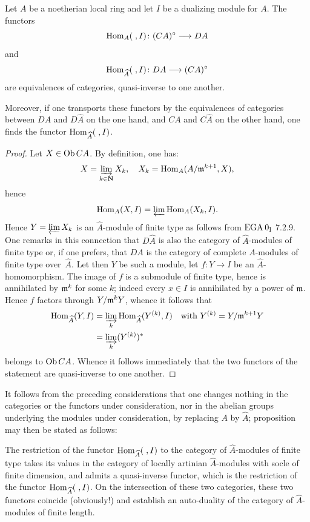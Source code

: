 \begin{proposition} \label{IV.5.1}
Let $A$ be a noetherian local ring and let $I$ be a dualizing module for $A$. The functors
$$
\Hom_{A}(\;, I)\colon (CA)^{\circ}\to DA
$$
and
$$
\Hom_{\hat{A}}(\;, I)\colon DA\to (CA)^{\circ}
$$
are equivalences of categories, quasi-inverse to one another.

Moreover, if one transports these functors by the equivalences of categories between $DA$ and $D\hat{A}$ on the one hand, and $CA$ and $C\hat{A}$ on the other hand, one finds the functor $\operatorname{Hom}_{\widehat{A}}(\;, I)$.
\end{proposition}

\begin{proof}
Let $X\in \operatorname{Ob} CA$. By definition, one has:
$$
X=\varinjlim_{k\in {\mathbf N}}X_{k}, \quad X_{k}=\operatorname{Hom}_{A}(A/\mathfrak{m}^{k+1}, X),
$$
hence
$$
\operatorname{Hom}_{A}(X, I)=\varprojlim \operatorname{Hom}_{A}(X_{k}, I).
$$
Hence $Y=\varprojlim X_{k}$ is an $\hat{A}$-module of finite type as follows from $\textup{EGA}\kern.2em 0_{\textup{I}}$ 7.2.9. One remarks in this connection that $D\hat{A}$ is also the category of $\hat{A}$-modules of finite type or, if one prefers, that $DA$ is the category of complete $A$-modules of finite type over~$\hat{A}$. Let then $Y$ be such a module, let $f:Y\to I$ be an $\hat{A}$-homomorphism. The image of $f$ is a submodule of finite type, hence is annihilated by $\mathfrak{m}^{k}$ for some $k$; indeed every $x\in I$ is annihilated by a power of $\mathfrak{m}$. Hence $f$ factors through $Y/\mathfrak{m}^{k}Y$, whence it follows that
\begin{align*}
\operatorname{Hom}_{\widehat{A}}(Y, I)&=\varinjlim_k\operatorname{Hom}_{\widehat{A}}(Y^{(k)}, I)\quad\text{with } Y^{(k)}=Y/\mathfrak{m}^{k+1}Y\\
&=\varinjlim_k(Y^{(k)})^*
\end{align*}
belongs to $\operatorname{Ob} CA$. Whence it follows immediately that the two functors of the statement are quasi-inverse to one another.
\skipqed
\end{proof}

It follows from the preceding considerations that one changes nothing
in the categories or the functors under consideration, nor in the
abelian groups underlying the modules under consideration, by replacing
$A$ by $\hat{A}$; proposition  may then be stated as follows:

The restriction of the functor $\operatorname{Hom}_{\widehat{A}}(\;, I)$ to the category of $\hat{A}$-modules of finite type takes its values in the category of locally artinian $\hat{A}$-modules with socle of finite dimension, and admits a quasi-inverse functor, which is the restriction of the functor $\operatorname{Hom}_{\widehat{A}}(\;, I)$. On the intersection of these two categories, these two functors coincide (obviously!) and establish an auto-duality of the category of $\hat{A}$-modules of finite length.

